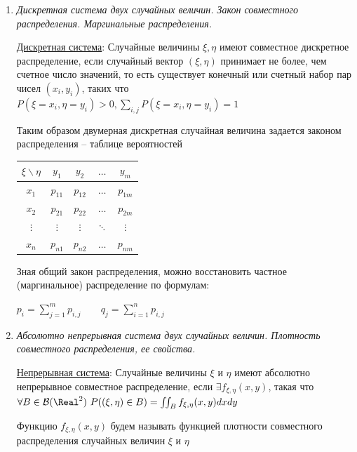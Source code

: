 \begin{enumerate}
    Случайные величины $\xi_1, \xi_2, \dots, \xi_n$ попарно независимы, если независимы любые две из них

    \item \textit{Дискретная система двух случайных величин. Закон совместного распределения. Маргинальные распределения.}

    \hyperlink{discretesystemoftwovariables}{Дискретная система}: Случайные величины $\xi, \eta$ имеют совместное дискретное распределение, если случайный вектор $(\xi, \eta)$
    принимает не более, чем счетное число значений, то есть существует конечный или счетный набор пар чисел $(x_i, y_i)$, 
    таких что $P(\xi = x_i, \eta = y_i) > 0, \sum_{i, j} P(\xi = x_i, \eta = y_i) = 1$
    
    Таким образом двумерная дискретная случайная величина задается законом распределения -- таблице вероятностей

    \begin{tabular}{c|c|c|c|c}
        $\xi \backslash \eta$ & $y_1$ & $y_2$ & $\dots$ & $y_m$ \\
        \hline
        $x_1$ & $p_{11}$ & $p_{12}$ & $\dots$ & $p_{1m}$ \\
        \hline
        $x_2$ & $p_{21}$ & $p_{22}$ & $\dots$ & $p_{2m}$ \\
        \hline
        $\vdots$ & $\vdots$ & $\vdots$ & $\ddots$ & $\vdots$ \\
        \hline
        $x_n$ & $p_{n1}$ & $p_{n2}$ & $\dots$ & $p_{nm}$ \\
    \end{tabular}

    Зная общий закон распределения, можно восстановить частное (маргинальное) распределение по формулам: 

    $p_i = \sum_{j = 1}^m p_{i, j} \qquad q_j = \sum_{i = 1}^n p_{i, j}$

    \item \textit{Абсолютно непрерывная система двух случайных величин. Плотность совместного распределения, ее свойства.}
    
    \hyperlink{continuoussystemoftwovariables}{Непрерывная система}: Случайные величины $\xi$ и $\eta$ имеют абсолютно непрерывное совместное распределение, если
    $\exists f_{\xi, \eta}(x, y)$, такая что $\forall B \in \mathcal{B}(\Real^2) \ P((\xi, \eta) \in B) = \iint_B f_{\xi, \eta}(x, y) dxdy$

    Функцию $f_{\xi, \eta}(x, y)$ будем называть функцией плотности совместного распределения случайных величин $\xi$ и $\eta$


\end{enumerate}
